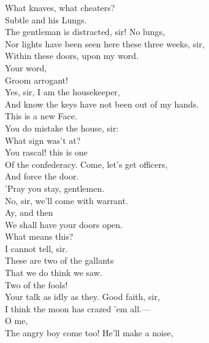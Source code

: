 \documentclass[a4paper,oneside]{memoir}
\begin{document}
\begin{drama*}
\lovewitspeaks What knaves, what cheaters?\\
\mammonspeaks {} Subtle and his Lungs.\\
\facespeaks The gentleman is distracted, sir! No lungs,\\
Nor lights have been seen here these three weeks, sir,\\
Within these doors, upon my word.\\
\surlyspeaks {} Your word,\\
Groom arrogant!\\
\facespeaks {} Yes, sir, I am the housekeeper,\\
And know the keys have not been out of my hands.\\
\surlyspeaks This is a new Face.\\
\facespeaks {} You do mistake the house, sir:\\
What sign was't at?\\
\surlyspeaks {} You rascal! this is one\\
Of the confederacy. Come, let's get officers,\\
And force the door.\\
\lovewitspeaks {} 'Pray you stay, gentlemen.\\
\surlyspeaks No, sir, we'll come with warrant.\\
\mammonspeaks {} Ay, and then\\
We shall have your doors open.\\
\lovewitspeaks {} What means this?\\
\facespeaks I cannot tell, sir.\\
\neighonespeaks {} These are two of the gallants\\
That we do think we saw.\\
\facespeaks {} Two of the fools!\\
Your talk as idly as they. Good faith, sir,\\
I think the moon has crazed 'em all.---\\
 O me,\\
The angry boy come too! He'll make a noise,\\

\end{drama*}
\end{document}

